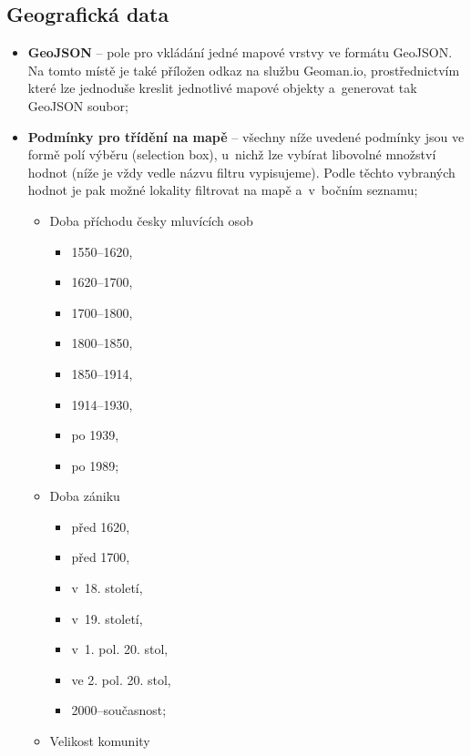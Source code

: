 \hypertarget{geografickuxe1-data}{%
\subsection{Geografická data}\label{geografickuxe1-data}}

\begin{itemize}
\tightlist
\item
  \textbf{GeoJSON} -- pole pro vkládání jedné mapové vrstvy ve formátu GeoJSON. Na tomto místě je také příložen odkaz na službu Geoman.io, prostřednictvím které lze jednoduše kreslit jednotlivé mapové objekty a~generovat tak GeoJSON soubor;
\item
  \textbf{Podmínky pro třídění na mapě} -- všechny níže uvedené podmínky jsou ve formě polí výběru (selection box), u~nichž lze vybírat libovolné množství hodnot (níže je vždy vedle názvu filtru vypisujeme). Podle těchto vybraných hodnot je pak možné lokality filtrovat na mapě a~v~bočním seznamu;

  \begin{itemize}
  \tightlist
  \item
    Doba příchodu česky mluvících osob

    \begin{itemize}
    \tightlist
    \item
      1550--1620,
    \item
      1620--1700,
    \item
      1700--1800,
    \item
      1800--1850,
    \item
      1850--1914,
    \item
      1914--1930,
    \item
      po 1939,
    \item
      po 1989;
    \end{itemize}
  \item
    Doba zániku

    \begin{itemize}
    \tightlist
    \item
      před 1620,
    \item
      před 1700,
    \item
      v~18. století,
    \item
      v~19. století,
    \item
      v~1. pol. 20. stol,
    \item
      ve 2. pol. 20. stol,
    \item
      2000--současnost;
    \end{itemize}
  \item
    Velikost komunity


\end{itemize}
\end{itemize}

